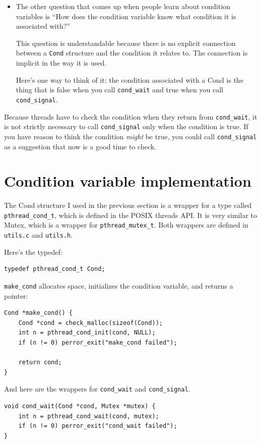 \documentclass[12pt]{book}
\begin{document}
{\begin{itemize}
\item The other question that comes up when people learn about condition
variables is ``How does the condition variable know what condition it
is associated with?''

This question is understandable because there is no explicit connection
between a {\tt Cond} structure and the condition it relates to.  The
connection is implicit in the way it is used.

Here's one way to think of it: the condition associated with a Cond
is the thing that is false when you call \verb"cond_wait" and true
when you call \verb"cond_signal".

\end{itemize}

Because threads have to check the condition when they return from
\verb"cond_wait", it is not strictly necessary to call \verb"cond_signal"
only when the condition is true.  If you have reason to think the
condition {\em might} be true, you could call \verb"cond_signal" as
a suggestion that now is a good time to check.


\section{Condition variable implementation}

The Cond structure I used in the previous section is a wrapper
for a type called \verb"pthread_cond_t", which is defined in the POSIX
threads API.  It is very similar to Mutex, which is a wrapper for
\verb"pthread_mutex_t".  Both wrappers are defined in {\tt utils.c} and
{\tt utils.h}.

Here's the typedef:

\begin{verbatim}
typedef pthread_cond_t Cond;
\end{verbatim}

\verb"make_cond" allocates space, initializes the condition variable,
and returns a pointer:

\begin{verbatim}
Cond *make_cond() {
    Cond *cond = check_malloc(sizeof(Cond)); 
    int n = pthread_cond_init(cond, NULL);
    if (n != 0) perror_exit("make_cond failed");
 
    return cond;
}
\end{verbatim}

And here are the wrappers for \verb"cond_wait" and \verb"cond_signal".

\begin{verbatim}
void cond_wait(Cond *cond, Mutex *mutex) {
    int n = pthread_cond_wait(cond, mutex);
    if (n != 0) perror_exit("cond_wait failed");
}


\end{verbatim}}
\end{document}
